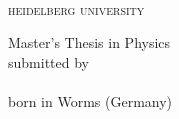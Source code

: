 \begin{titlingpage}
\begin{centered}
{}
\\[.8cm]
{\firalight\fontsize{36}{48}\selectfont\scshape\MakeLowercase{Heidelberg University}}

\vfill

Master's Thesis in Physics\\
submitted by\\
\vspace{0.5cm}
\\
\vspace{0.5cm} \rmfamily 
born in Worms (Germany)\\
\vspace{0.5cm}
\end{centered}
\end{titlingpage}

\cleardoublepage
